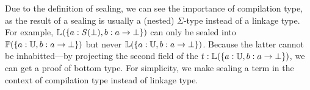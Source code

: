 




Due to the definition of sealing, we can see the importance of compilation type, as the result of a sealing is usually a (nested) $\Sigma$-type instead of a linkage type. For example, $\mathbb{L}({\{a : S(\bot), b : a \to \bot\}})$ can only be sealed into $\mathbb{P}({\{a : \mathbb{U}, b : a \to \bot\}})$ but never $\mathbb{L}({\{a : \mathbb{U}, b : a \to \bot\}})$. Because the latter cannot be inhabitted---by projecting the second field of the $ t : \mathbb{L}({\{a : \mathbb{U}, b : a \to \bot\}})$, we can get a proof of bottom type. For simplicity, we make sealing a term in the context of compilation type instead of linkage type.


